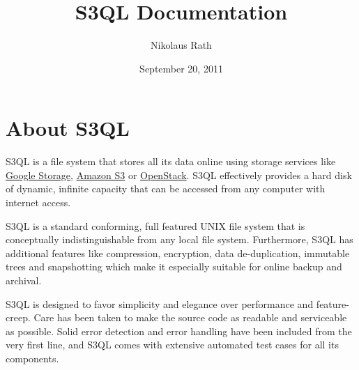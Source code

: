 \documentclass[letterpaper,10pt,english]{sphinxmanual}
\title{S3QL Documentation}
\date{September 20, 2011}
\author{Nikolaus Rath}
\begin{document}
\maketitle
\tableofcontents
{}\label{index::doc}



\chapter{About S3QL}
\label{about:about-s3ql}\label{about::doc}\label{about:s3ql-user-s-guide}
S3QL is a file system that stores all its data online using storage
services like \href{http://code.google.com/apis/storage/}{Google Storage}, \href{http://aws.amazon.com/s3AmazonS3}{Amazon S3} or \href{http://openstack.org/projects/storage/}{OpenStack}. S3QL effectively provides
a hard disk of dynamic, infinite capacity that can be accessed from
any computer with internet access.

S3QL is a standard conforming, full featured UNIX file system that is
conceptually indistinguishable from any local file system.
Furthermore, S3QL has additional features like compression,
encryption, data de-duplication, immutable trees and snapshotting
which make it especially suitable for online backup and archival.

S3QL is designed to favor simplicity and elegance over performance and
feature-creep. Care has been taken to make the source code as
readable and serviceable as possible. Solid error detection and error
handling have been included from the very first line, and S3QL comes
with extensive automated test cases for all its components.
\end{document}
